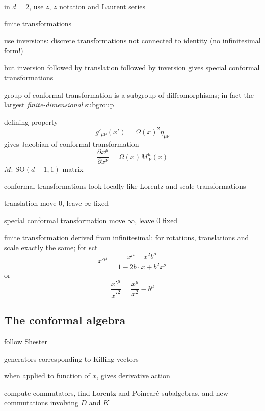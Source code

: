 \documentclass[a4paper,12pt]{article}
\newcommand{\SO}{\text{SO}}
\numberwithin{equation}{section}
\begin{document}
in $d = 2$, use $z$, $\bar{z}$ notation and Laurent series






finite transformations


use inversions: discrete transformations not connected to identity
(no infinitesimal form!)

but inversion followed by translation followed by inversion gives special conformal transformations


group of conformal transformation is a subgroup of diffeomorphisms; in fact the largest \emph{finite-dimensional} subgroup



defining property
\begin{equation}
	g'_{\mu\nu}(x') = \Omega(x)^2 \eta_{\mu\nu}
\end{equation}
gives Jacobian of conformal transformation
\begin{equation}
	\frac{\partial x^\mu}{\partial x^\nu}
	= \Omega(x) M^\mu_{~\nu}(x)
\end{equation}
$M$: $\SO(d-1, 1)$ matrix

conformal transformations look locally like Lorentz and scale transformations



translation move 0, leave $\infty$ fixed

special conformal transformation move $\infty$, leave 0 fixed


finite transformation derived from infinitesimal: for rotations, translations and scale exactly the same;
for sct
\begin{equation}
	x'^\mu = \frac{x^\mu - x^2 b^\mu}
	{1 - 2 b \cdot x + b^2 x^2} 
\end{equation}
or 
\begin{equation}
	\frac{x'^\mu}{x'^2} = \frac{x^\mu}{x^2} - b^\mu
\end{equation}

\subsection{The conformal algebra}

follow Shester

generators corresponding to Killing vectors

when applied to function of $x$, gives derivative action



compute commutators, find Lorentz and Poincaré subalgebras, and new commutations involving $D$ and $K$
\end{document}
